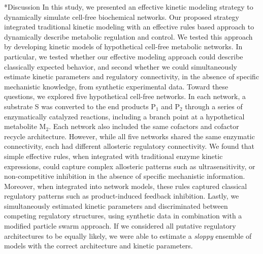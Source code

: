 \documentclass[12pt]{article}
\makeatletter
\renewcommand\section{\@startsection
	{subsection}{2}{0mm}
	{-0.2in}
	{0.05\baselineskip}
	{\normalfont\large\bfseries}}
\makeatother
\begin{document}
\clearpage

\section*{Discussion}
In this study, we presented an effective kinetic modeling strategy to dynamically simulate cell-free biochemical networks. 
Our proposed strategy integrated traditional kinetic modeling with an effective rules based approach to dynamically describe metabolic regulation and control. 
We tested this approach by developing kinetic models of hypothetical cell-free metabolic networks. 
In particular, we tested whether our effective modeling approach could describe classically expected behavior, and second whether we could simultaneously estimate kinetic parameters and regulatory connectivity, in the absence of specific mechanistic knowledge, from synthetic experimental data. 
Toward these questions, we explored five hypothetical cell-free networks. 
In each network, a substrate S was converted to the end products P$_{1}$ and P$_{2}$ through a series of enzymatically catalyzed reactions, including a branch point at a hypothetical metabolite M$_{2}$. 
Each network also included the same cofactors and cofactor recycle architecture. 
However, while all five networks shared the same enzymatic connectivity, each had different allosteric regulatory connectivity. 
We found that simple effective rules, when integrated with traditional enzyme kinetic expressions, could capture complex allosteric patterns such as ultrasensitivity, or non-competitive inhibition in the absence of specific mechanistic information. 
Moreover, when integrated into network models, these rules captured classical regulatory patterns such as product-induced feedback inhibition. 
Lastly, we simultaneously estimated kinetic parameters and discriminated between competing regulatory structures, using synthetic data in combination with a modified particle swarm approach.
If we considered all putative regulatory architectures to be equally likely, we were able to estimate a \textit{sloppy} ensemble of models with the correct architecture and kinetic parameters.
\end{document}
